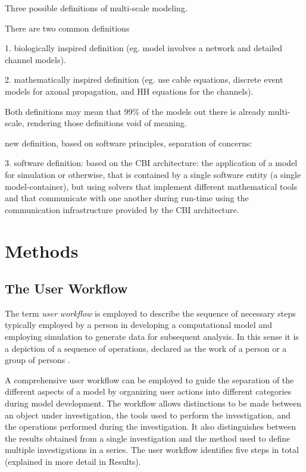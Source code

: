 \documentclass[12pt]{article}
\begin{document}
Three possible definitions of multi-scale modeling.

There are two common definitions

1. biologically inspired definition (eg. model involves a network and
detailed channel models).

2. mathematically inspired definition (eg. use cable equations,
discrete event models for axonal propagation, and HH equations for the
channels).

Both definitions may mean that 99\% of the models out there is already
multi-scale, rendering those definitions void of meaning.

new definition, based on software principles, separation of concerns:

3. software definition: based on the CBI architecture: the application
of a model for simulation or otherwise, that is contained by a single
software entity (a single model-container), but using solvers that
implement different mathematical tools and that communicate with one
another during run-time using the communication infrastructure
provided by the CBI architecture.

\section*{Methods}

\subsection*{The User Workflow}

The term {\it user workflow} is employed to describe the sequence of
necessary steps typically employed by a person in developing a
computational model and employing simulation to generate data for
subsequent analysis. In this sense it is a depiction of a sequence of
operations, declared as the work of a person or a group of persons
\cite{Belhajjame:2001fv}.

A comprehensive user workflow can be employed to guide the separation
of the different aspects of a model by organizing user actions into
different categories during model development.  The workflow allows
distinctions to be made between an object under investigation, the
tools used to perform the investigation, and the operations performed
during the investigation. It also distinguishes between the results
obtained from a single investigation and the method used to define
multiple investigations in a series. The user workflow identifies five
steps in total (explained in more detail in Results).
\end{document}
